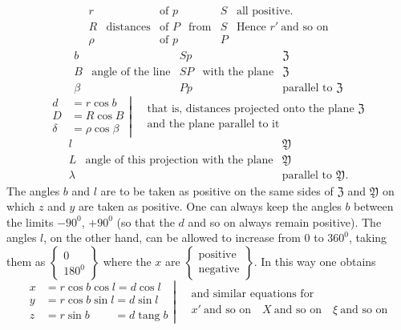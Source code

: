 %
\[
\begin{array}{c|c|c|c|c|l}
r&&\text{of }p&&S&\text{all positive.}\\
R&\text{distances}&\text{of }P&\text{from}&S&\text{Hence }r'\ \text{and so on}\\
\rho&&\text{of }p&&P&
\end{array}
\]
\[
\begin{array}{c|c|c|c|l}
b&&Sp&&\mathfrak{Z}\\
B&\text{angle of the line}&SP&\text{with the plane}&\mathfrak{Z}\\
\beta&&Pp&&\text{parallel to }\mathfrak{Z}
\end{array}
\]
\[
\left.\begin{aligned}
d&=r\cos b\\D&=R\cos B\\\delta&=\rho\cos\beta
\end{aligned}\right|\quad
\begin{gathered}\text{that is, distances projected onto the plane }\mathfrak{Z}\\\text{and the plane parallel to it}\end{gathered}
\]
\[
\begin{array}{c|c|l}
l&&\mathfrak{Y}\\
L&\text{angle of this projection with the plane}&\mathfrak{Y}\\
\lambda&&\text{parallel to }\mathfrak{Y}\text{.}
\end{array}
\]
The angles $b$ and $l$ are to be taken as positive on the same sides of $\mathfrak{Z}$ and $\mathfrak{Y}$ on which $z$ and $y$ are taken as positive. One can always keep the angles $b$ between the limits $-90^0$, $+90^0$ (so that the $d$ and so on always remain positive). The angles $l$, on the other hand, can be allowed to increase from $0$ to $360^0$, taking them as $\left\{\begin{smallmatrix}0\\180^0\end{smallmatrix}\right\}$ where the $x$ are $\left\{\begin{smallmatrix}\text{positive}\\\text{negative}\end{smallmatrix}\right\}$. In this way one obtains
\[
\left.\begin{aligned}
x&=r\cos b\cos l=d\cos l\\
y&=r\cos b\sin l=d\sin l\\
z&=r\sin b\phantom{\cos l}=d\operatorname{tang}b
\end{aligned}\right|\quad
\begin{gathered}\text{and similar equations for}\\x'\ \text{and so on}\quad X\ \text{and so on}\quad\xi\ \text{and so on}\end{gathered}
\]

